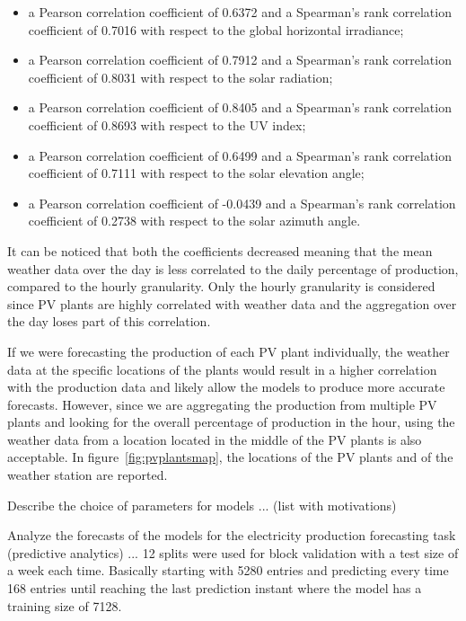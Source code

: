 \begin{itemize}
  \item a Pearson correlation coefficient of 0.6372 and a Spearman's rank correlation coefficient of 0.7016 with respect to the global horizontal irradiance;
  \item a Pearson correlation coefficient of 0.7912 and a Spearman's rank correlation coefficient of 0.8031 with respect to the solar radiation;
  \item a Pearson correlation coefficient of 0.8405 and a Spearman's rank correlation coefficient of 0.8693 with respect to the UV index;
  \item a Pearson correlation coefficient of 0.6499 and a Spearman's rank correlation coefficient of 0.7111 with respect to the solar elevation angle;
  \item a Pearson correlation coefficient of -0.0439 and a Spearman's rank correlation coefficient of 0.2738 with respect to the solar azimuth angle.
\end{itemize}
It can be noticed that both the coefficients decreased meaning that the mean weather data over the day is less correlated to the daily percentage of production, compared to the hourly granularity.
Only the hourly granularity is considered since PV plants are highly correlated with weather data and the aggregation over the day loses part of this correlation.

If we were forecasting the production of each PV plant individually, the weather data at the specific locations of the plants would result in a higher correlation with the production data and likely allow the models to produce more accurate forecasts.
However, since we are aggregating the production from multiple PV plants and looking for the overall percentage of production in the hour, using the weather data from a location located in the middle of the PV plants is also acceptable.
In figure~\ref{fig:pvplantsmap}, the locations of the PV plants and of the weather station are reported.

Describe the choice of parameters for models ... (list with motivations)

Analyze the forecasts of the models for the electricity production forecasting task (predictive analytics) ...
12 splits were used for block validation with a test size of a week each time.
Basically starting with 5280 entries and predicting every time 168 entries until reaching the last prediction instant where the model has a training size of 7128.

